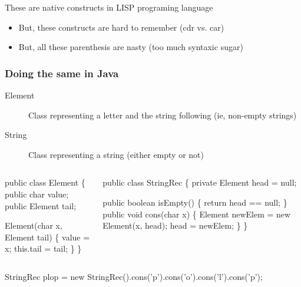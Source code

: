 \begin{Coupe}
\begin{frame}
  \begin{alertblock}{These are native constructs in LISP programing language}
  \begin{itemize}\vspace{-.3\baselineskip}
  \item But, these constructs are hard to remember (cdr vs. car)
  \item But, all these parenthesis are nasty (too much syntaxic sugar)
  \end{itemize}
  \end{alertblock}
\end{frame}
\begin{frame}[fragile]\frametitle{Doing the same in Java}
  \begin{description}
  \item[Element] Class representing a letter and the string following
    (ie, non-empty strings)
  \item[String] Class representing a string (either empty or not)
  \end{description}\vspace{-.6\baselineskip}

  \begin{columns}[t]
    \begin{column}{.36\linewidth}
      \begin{boitecode}{}
public \alert{class Element} \{
  public char value;
  public Element tail;

  Element(char x, Element tail) \{
      value = x;
      this.tail = tail;
  \}    
\}
  \end{boitecode}
    \end{column}

    \begin{column}{.5\linewidth}
  \begin{boitecode}{}
public \alert{class StringRec} \{
  private Element head = null;

  public boolean isEmpty() \{ 
      return head == null;
  \}
  public void cons(char x) \{
    Element newElem = new Element(x, head);
    head = newElem;
\} \}    
  \end{boitecode}
\end{column}
\end{columns}

  \begin{boitecode}{}
StringRec plop = new StringRec().cons('p').cons('o').cons('l').cons('p');
  \end{boitecode}


\end{frame}
\end{Coupe}
